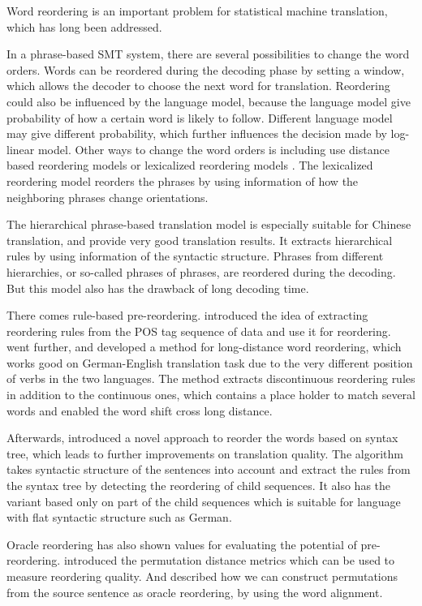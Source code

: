 Word reordering is an important problem for statistical machine translation, which has long been addressed.

In a phrase-based SMT system, there are several possibilities to change the word orders. Words can be reordered during the decoding phase by setting a window, which allows the decoder to choose the next word for translation. Reordering could also be influenced by the language model, because the language model give probability of how a certain word is likely to follow. Different language model may give different probability, which further influences the decision made by log-linear model. Other ways to change the word orders is including use distance based reordering models or lexicalized reordering models \citep{tillmann2004, koehn2005}. The lexicalized reordering model reorders the phrases by using information of how the neighboring phrases change orientations.

The hierarchical phrase-based translation model \citep{hier} is especially suitable for Chinese translation, and provide very good translation results. It extracts hierarchical rules by using information of the syntactic structure. Phrases from different hierarchies, or so-called phrases of phrases, are reordered during the decoding. But this model also has the drawback of long decoding time.


There comes rule-based pre-reordering.
\cite{short} introduced the idea of extracting reordering rules from the POS tag sequence of data and use it for reordering. \cite{long} went further, and developed a method for long-distance word reordering, which works good on German-English translation task due to the very different position of verbs in the two languages. The method extracts discontinuous reordering rules in addition to the continuous ones, which contains a place holder to match several words and enabled the word shift cross long distance.

Afterwards, \cite{tree} introduced a novel approach to reorder the words based on syntax tree, which leads to further improvements on translation quality. The algorithm takes syntactic structure of the sentences into account and extract the rules from the syntax tree by detecting the reordering of child sequences. It also has the variant based only on part of the child sequences which is suitable for language with flat syntactic structure such as German.

Oracle reordering has also shown values for evaluating the potential of pre-reordering. \cite{metrics} introduced the permutation distance metrics which can be used to measure reordering quality. And \cite{birch2} described how we can construct permutations from the source sentence as oracle reordering, by using the word alignment.

